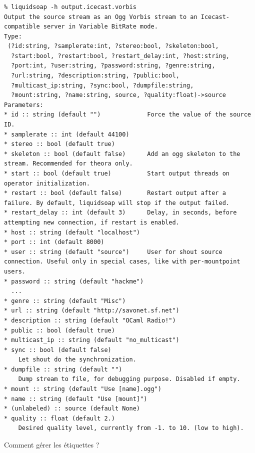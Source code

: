 \documentclass{beamer}
\begin{document}
\begin{frame}[fragile]
  \frametitle{}
  {\small
\begin{verbatim}
% liquidsoap -h output.icecast.vorbis
Output the source stream as an Ogg Vorbis stream to an Icecast-compatible server in Variable BitRate mode.
Type:
 (?id:string, ?samplerate:int, ?stereo:bool, ?skeleton:bool,
  ?start:bool, ?restart:bool, ?restart_delay:int, ?host:string,
  ?port:int, ?user:string, ?password:string, ?genre:string,
  ?url:string, ?description:string, ?public:bool,
  ?multicast_ip:string, ?sync:bool, ?dumpfile:string,
  ?mount:string, ?name:string, source, ?quality:float)->source
Parameters:
* id :: string (default "")             Force the value of the source ID.
* samplerate :: int (default 44100)
* stereo :: bool (default true)
* skeleton :: bool (default false)      Add an ogg skeleton to the stream. Recommended for theora only.
* start :: bool (default true)          Start output threads on operator initialization.
* restart :: bool (default false)       Restart output after a failure. By default, liquidsoap will stop if the output failed.
* restart_delay :: int (default 3)      Delay, in seconds, before attempting new connection, if restart is enabled.
* host :: string (default "localhost")
* port :: int (default 8000)
* user :: string (default "source")     User for shout source connection. Useful only in special cases, like with per-mountpoint users.
* password :: string (default "hackme")
  ...
* genre :: string (default "Misc")
* url :: string (default "http://savonet.sf.net")
* description :: string (default "OCaml Radio!")
* public :: bool (default true)
* multicast_ip :: string (default "no_multicast")
* sync :: bool (default false)
    Let shout do the synchronization.
* dumpfile :: string (default "")
    Dump stream to file, for debugging purpose. Disabled if empty.
* mount :: string (default "Use [name].ogg")
* name :: string (default "Use [mount]")
* (unlabeled) :: source (default None)
* quality :: float (default 2.)
    Desired quality level, currently from -1. to 10. (low to high).
\end{verbatim}
  }
\end{frame}

\begin{frame}
  \begin{center}
    Comment gérer les étiquettes ?
  \end{center}
\end{frame}
\end{document}
